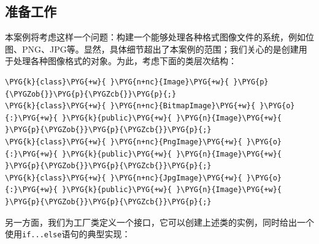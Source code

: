 
\subsection{准备工作}



本案例将考虑这样一个问题：构建一个能够处理各种格式图像文件的系统，例如位图、PNG、JPG等。显然，具体细节超出了本案例的范围；我们关心的是创建用于处理各种图像格式的对象。为此，考虑下面的类层次结构：



\begin{codeblockbg}
\begin{Verbatim}[commandchars=\\\{\},breaklines=true,breakanywhere=true,fontsize=\codefont,xleftmargin=17bp]
\PYG{k}{class}\PYG{+w}{ }\PYG{n+nc}{Image}\PYG{+w}{ }\PYG{p}{\PYGZob{}}\PYG{p}{\PYGZcb{}}\PYG{p}{;}
\PYG{k}{class}\PYG{+w}{ }\PYG{n+nc}{BitmapImage}\PYG{+w}{ }\PYG{o}{:}\PYG{+w}{ }\PYG{k}{public}\PYG{+w}{ }\PYG{n}{Image}\PYG{+w}{ }\PYG{p}{\PYGZob{}}\PYG{p}{\PYGZcb{}}\PYG{p}{;}
\PYG{k}{class}\PYG{+w}{ }\PYG{n+nc}{PngImage}\PYG{+w}{ }\PYG{o}{:}\PYG{+w}{ }\PYG{k}{public}\PYG{+w}{ }\PYG{n}{Image}\PYG{+w}{ }\PYG{p}{\PYGZob{}}\PYG{p}{\PYGZcb{}}\PYG{p}{;}
\PYG{k}{class}\PYG{+w}{ }\PYG{n+nc}{JpgImage}\PYG{+w}{ }\PYG{o}{:}\PYG{+w}{ }\PYG{k}{public}\PYG{+w}{ }\PYG{n}{Image}\PYG{+w}{ }\PYG{p}{\PYGZob{}}\PYG{p}{\PYGZcb{}}\PYG{p}{;}
\end{Verbatim}
\end{codeblockbg}



另一方面，我们为工厂类定义一个接口，它可以创建上述类的实例，同时给出一个使用\texttt{if...\allowbreak{}else}语句的典型实现：



